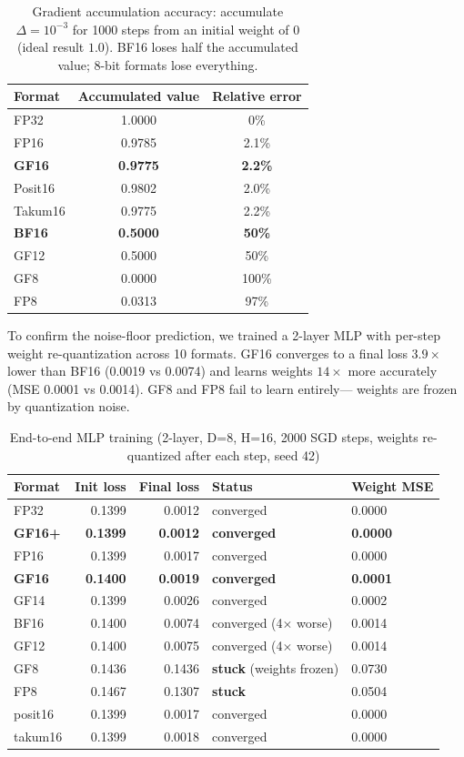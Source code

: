 \documentclass[11pt]{article}
\begin{document}
\begin{table}[h]
\centering
\small
\caption{Gradient accumulation accuracy: accumulate $\Delta = 10^{-3}$ for
1000 steps from an initial weight of $0$ (ideal result $1.0$). BF16 loses half
the accumulated value; 8-bit formats lose everything.}
\label{tab:gradaccum}
\begin{tabular}{lcc}
\toprule
Format & Accumulated value & Relative error \\
\midrule
FP32       & 1.0000 & 0\%     \\
FP16       & 0.9785 & 2.1\%   \\
\textbf{GF16}  & \textbf{0.9775} & \textbf{2.2\%}   \\
Posit16    & 0.9802 & 2.0\%   \\
Takum16    & 0.9775 & 2.2\%   \\
\textbf{BF16}  & \textbf{0.5000} & \textbf{50\%}    \\
GF12       & 0.5000 & 50\%    \\
GF8        & 0.0000 & 100\%   \\
FP8        & 0.0313 & 97\%    \\
\bottomrule
\end{tabular}
\end{table}

To confirm the noise-floor prediction, we trained a 2-layer MLP with per-step
weight re-quantization across 10 formats. GF16 converges to a final loss
$3.9\times$ lower than BF16 (0.0019 vs 0.0074) and learns weights $14\times$
more accurately (MSE 0.0001 vs 0.0014). GF8 and FP8 fail to learn entirely---
weights are frozen by quantization noise.

\begin{table}[h]
\footnotesize
\caption{End-to-end MLP training (2-layer, D=8, H=16, 2000 SGD steps,
weights re-quantized after each step, seed 42)}
\label{tab:mlp}
\centering
\begin{tabular}{lrrll}
\toprule
Format & Init loss & Final loss & Status & Weight MSE \\
\midrule
FP32 & 0.1399 & 0.0012 & converged & 0.0000 \\
\textbf{GF16+} & \textbf{0.1399} & \textbf{0.0012} & \textbf{converged} & \textbf{0.0000} \\
FP16 & 0.1399 & 0.0017 & converged & 0.0000 \\
\textbf{GF16} & \textbf{0.1400} & \textbf{0.0019} & \textbf{converged} & \textbf{0.0001} \\
GF14 & 0.1399 & 0.0026 & converged & 0.0002 \\
BF16 & 0.1400 & 0.0074 & converged (4$\times$ worse) & 0.0014 \\
GF12 & 0.1400 & 0.0075 & converged (4$\times$ worse) & 0.0014 \\
GF8 & 0.1436 & 0.1436 & \textbf{stuck} (weights frozen) & 0.0730 \\
FP8 & 0.1467 & 0.1307 & \textbf{stuck} & 0.0504 \\
posit16 & 0.1399 & 0.0017 & converged & 0.0000 \\
takum16 & 0.1399 & 0.0018 & converged & 0.0000 \\
\bottomrule
\end{tabular}
\end{table}
\end{document}
